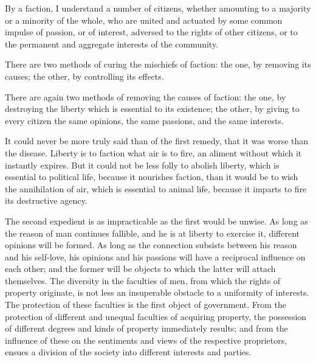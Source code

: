 By a faction, I understand a number of citizens, whether amounting to a majority or a minority of the whole, who are united and actuated by some common impulse of passion, or of interest, adversed to the rights of other citizens, or to the permanent and aggregate interests of the community.

There are two methods of curing the mischiefs of faction: the one, by removing its causes; the other, by controlling its effects.

There are again two methods of removing the causes of faction: the one, by destroying the liberty which is essential to its existence; the other, by giving to every citizen the same opinions, the same passions, and the same interests.

It could never be more truly said than of the first remedy, that it was worse than the disease. 
Liberty is to faction what air is to fire, an aliment without which it instantly expires. 
But it could not be less folly to abolish liberty, which is essential to political life, because it nourishes faction, than it would be to wish the annihilation of air, which is essential to animal life, because it imparts to fire its destructive agency.

The second expedient is as impracticable as the first would be unwise. 
As long as the reason of man continues fallible, and he is at liberty to exercise it, different opinions will be formed. 
As long as the connection subsists between his reason and his self-love, his opinions and his passions will have a reciprocal influence on each other; and the former will be objects to which the latter will attach themselves. 
The diversity in the faculties of men, from which the rights of property originate, is not less an insuperable obstacle to a uniformity of interests. 
The protection of these faculties is the first object of government. 
From the protection of different and unequal faculties of acquiring property, the possession of different degrees and kinds of property immediately results; and from the influence of these on the sentiments and views of the respective proprietors, ensues a division of the society into different interests and parties.

